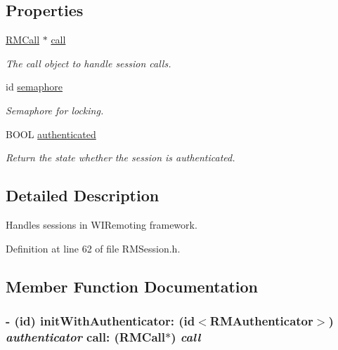 \subsection*{Properties}
\begin{DoxyCompactItemize}
\item 
\hypertarget{interface_r_m_session_a1eb4cd25fd5ff4adb90fd2025b2bd3ee}{
\hyperlink{interface_r_m_call}{RMCall} $\ast$ \hyperlink{interface_r_m_session_a1eb4cd25fd5ff4adb90fd2025b2bd3ee}{call}}
\label{interface_r_m_session_a1eb4cd25fd5ff4adb90fd2025b2bd3ee}

\begin{DoxyCompactList}\small\item\em The call object to handle session calls. \item\end{DoxyCompactList}\item 
\hypertarget{interface_r_m_session_a6185aabc32345064c8e643f9f9e1bcf3}{
id \hyperlink{interface_r_m_session_a6185aabc32345064c8e643f9f9e1bcf3}{semaphore}}
\label{interface_r_m_session_a6185aabc32345064c8e643f9f9e1bcf3}

\begin{DoxyCompactList}\small\item\em Semaphore for locking. \item\end{DoxyCompactList}\item 
BOOL \hyperlink{interface_r_m_session_a71acbe4da4033e724b01e44d39ea2f24}{authenticated}
\begin{DoxyCompactList}\small\item\em Return the state whether the session is authenticated. \item\end{DoxyCompactList}\end{DoxyCompactItemize}


\subsection{Detailed Description}
Handles sessions in WIRemoting framework. 

Definition at line 62 of file RMSession.h.

\subsection{Member Function Documentation}
\hypertarget{interface_r_m_session_a17841007deca0854a7926b895f46fa10}{
\subsubsection[{initWithAuthenticator:call:}]{\setlength{\rightskip}{0pt plus 5cm}-\/ (id) initWithAuthenticator: (id$<${\bf RMAuthenticator}$>$) {\em authenticator}\/ call: ({\bf RMCall}$\ast$) {\em call}}}
\label{interface_r_m_session_a17841007deca0854a7926b895f46fa10}


